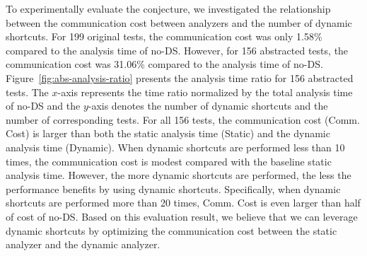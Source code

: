 To experimentally evaluate the conjecture, we investigated the relationship between
the communication cost between analyzers and the number of dynamic shortcuts.
For 199 original tests, the communication cost was only
1.58\% compared to the analysis time of no-DS.  However, for 156
abstracted tests, the communication cost was 31.06\% compared to the analysis
time of no-DS.  Figure~\ref{fig:abs-analysis-ratio} presents the
analysis time ratio for 156 abstracted tests.
The $x$-axis represents the time ratio normalized by the total analysis time of
no-DS and the $y$-axis denotes the number of dynamic
shortcuts and the number of corresponding tests.
For all 156 tests, the communication cost (Comm. Cost) is larger than
both the static analysis time (Static) and the dynamic analysis
time (Dynamic).  When dynamic shortcuts are performed less than 10 times,
the communication cost is modest compared with the baseline static
analysis time.  However, the more dynamic shortcuts are performed,
the less the performance benefits by using dynamic shortcuts.
Specifically, when dynamic shortcuts are performed more than 20 times,
Comm. Cost is even larger than half of cost of no-DS.
Based on this evaluation result, we believe that we can leverage
dynamic shortcuts by optimizing the communication cost between
the static analyzer and the dynamic analyzer.

